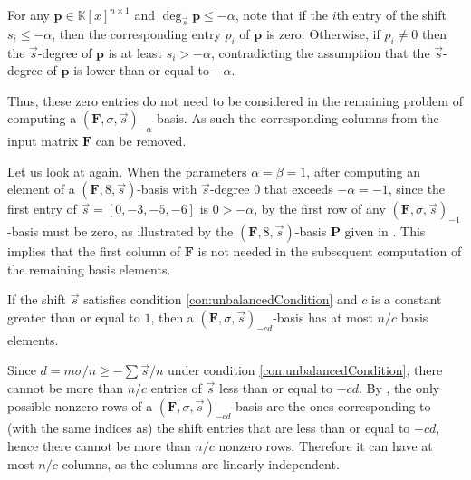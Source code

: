 \begin{pf}
For any $\mathbf{p}\in\mathbb{K}\left[x\right]^{n\times1}$ and $\deg_{\vec{s}}\mathbf{p}\le-\alpha$,
note that if the $i$th entry of the shift $s_{i}\le-\alpha$, then
the corresponding entry $p_{i}$ of $\mathbf{p}$ is zero. %
Otherwise, if $p_{i}\ne0$ then the $\vec{s}$-degree of $\mathbf{p}$
is at least $s_{i}>-\alpha$, contradicting the assumption that the
$\vec{s}$-degree of $\mathbf{p}$ is lower than or equal to $-\alpha$. 
\end{pf}
Thus, these zero entries do not need to be considered in the remaining
problem of computing a $\left(\mathbf{F},\sigma,\vec{s}\right)_{-\alpha}$-basis.
As such the corresponding columns from the input matrix $\mathbf{F}$
can be removed.
\begin{exmp}
Let us look at  again. When the parameters
$\alpha=\beta=1$, after computing an element of a $(\mathbf{F},8,\vec{s})$-basis
with $\vec{s}$-degree $0$ that exceeds $-\alpha=-1$, since the
first entry of $\vec{s}=[0,-3,-5,-6]$ is $0>-\alpha$, by 
the first row of any $\left(\mathbf{F},\sigma,\vec{s}\right)_{-1}$-basis
must be zero, as illustrated by the $(\mathbf{F},8,\vec{s})$-basis
$\mathbf{P}$ given in . This implies
that the first column of $\mathbf{F}$ is not needed in the subsequent
computation of the remaining basis elements.\end{exmp}
\begin{cor}
\label{cor:numberBasisElements}If the shift $\vec{s}$ satisfies
condition \eqref{con:unbalancedCondition} and $c$ is a constant
greater than or equal to $1$, then a $\left(\mathbf{F},\sigma,\vec{s}\right)_{-cd}$-basis
has at most $n/c$ basis elements.\end{cor}
\begin{pf}
Since $d=m\sigma/n\ge-\sum\vec{s}/n$ under condition \eqref{con:unbalancedCondition},
there cannot be more than $n/c$ entries of $\vec{s}$ less than or
equal to $-cd$. By , the only
possible nonzero rows of a $\left(\mathbf{F},\sigma,\vec{s}\right)_{-cd}$-basis
are the ones corresponding to (with the same indices as) the shift
entries that are less than or equal to $-cd$, hence there cannot
be more than $n/c$ nonzero rows. Therefore it can have at most $n/c$
columns, as the columns are linearly independent. 
\end{pf}
